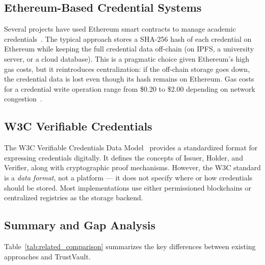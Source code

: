 \documentclass[conference]{IEEEtran}
\begin{document}
\subsection{Ethereum-Based Credential Systems}
Several projects have used Ethereum smart contracts to manage academic credentials~\cite{lizcano2020blockchain}. The typical approach stores a SHA-256 hash of each credential on Ethereum while keeping the full credential data off-chain (on IPFS, a university server, or a cloud database). This is a pragmatic choice given Ethereum's high gas costs, but it reintroduces centralization: if the off-chain storage goes down, the credential data is lost even though its hash remains on Ethereum. Gas costs for a credential write operation range from \$0.20 to \$2.00 depending on network congestion~\cite{wood2014ethereum}.

\subsection{W3C Verifiable Credentials}
The W3C Verifiable Credentials Data Model~\cite{w3c2022vc} provides a standardized format for expressing credentials digitally. It defines the concepts of Issuer, Holder, and Verifier, along with cryptographic proof mechanisms. However, the W3C standard is a \emph{data format}, not a platform — it does not specify where or how credentials should be stored. Most implementations use either permissioned blockchains or centralized registries as the storage backend.

\subsection{Summary and Gap Analysis}

Table~\ref{tab:related_comparison} summarizes the key differences between existing approaches and TrustVault.
\end{document}
